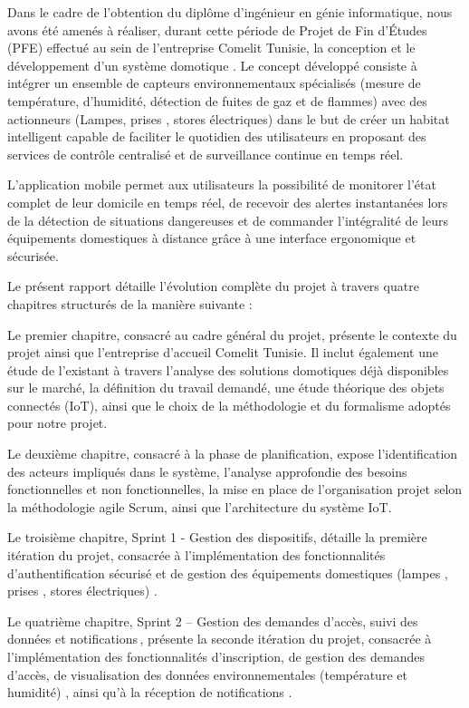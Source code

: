 \documentclass{article}
\begin{document}
Dans le cadre de l'obtention du diplôme d'ingénieur en génie informatique, nous avons été amenés à réaliser, durant cette période de Projet de Fin d'Études (PFE) effectué au sein de l'entreprise Comelit Tunisie, la conception et le développement d'un système domotique . Le concept développé consiste à intégrer  un ensemble de capteurs environnementaux spécialisés (mesure de température, d'humidité, détection de fuites de gaz et de flammes) avec des actionneurs  (Lampes, prises , stores électriques) dans le but de créer un habitat intelligent capable de faciliter le quotidien des utilisateurs en proposant des services  de contrôle centralisé et de surveillance continue en temps réel.

L'application mobile permet aux utilisateurs la possibilité de monitorer l'état complet de leur domicile en temps réel, de recevoir des alertes instantanées lors de la détection de situations dangereuses et de commander l'intégralité de leurs équipements domestiques à distance grâce à une interface ergonomique et sécurisée. 

Le présent rapport détaille l'évolution complète du projet à travers quatre chapitres structurés de la manière suivante :

Le premier chapitre, consacré au cadre général du projet, présente le contexte du projet ainsi que l’entreprise d’accueil Comelit Tunisie. Il inclut également une étude de l’existant à travers l’analyse des solutions domotiques déjà disponibles sur le marché, la définition du travail demandé, une étude théorique des objets connectés (IoT), ainsi que le choix de la méthodologie et du formalisme adoptés pour notre projet.

Le deuxième chapitre, consacré à la phase de planification, expose l'identification  des acteurs impliqués dans le système, l'analyse approfondie des besoins fonctionnelles et non fonctionnelles, la mise en place de l'organisation projet selon la méthodologie agile Scrum, ainsi que l'architecture  du système IoT.

Le troisième chapitre, Sprint 1 - Gestion des dispositifs, détaille la première itération du projet, consacrée à l'implémentation des fonctionnalités d'authentification sécurisé et  de gestion des équipements domestiques (lampes , prises , stores électriques) .

Le quatrième chapitre, Sprint 2 – Gestion des demandes d’accès, suivi des données et notifications , présente la seconde itération du projet, consacrée à l’implémentation des fonctionnalités d’inscription, de gestion des demandes d’accès, de visualisation des données environnementales (température et humidité) , ainsi qu’à la réception de notifications .
\end{document}
